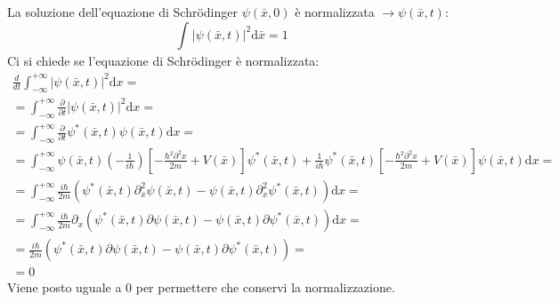 La soluzione dell'equazione di Schrödinger $\psi \left(\bar x,0\right)$ è normalizzata $\rightarrow \psi \left(\bar x,t\right)$:
\begin{equation}
\int_{}^{}{|\psi \left(\bar x,t\right)|^2 \textrm{d}\bar x}=1
\end{equation}
Ci si chiede se l'equazione di Schrödinger è normalizzata:
\begin{equation}\begin{split}
\frac{d}{dt}\int_{-\infty}^{+\infty}{|\psi \left(\bar x,t\right)|^2 \textrm{d}x}=\\
=\int_{-\infty}^{+\infty}{\frac{\partial }{\partial t}|\psi \left(\bar x,t\right)|^2 \textrm{d}x}=\\
=\int_{-\infty}^{+\infty}{\frac{\partial }{\partial t}\psi ^*\left(\bar x,t\right)\psi \left(\bar x,t\right) \textrm{d}x}=\\
=\int_{-\infty}^{+\infty}{\psi\left(\bar x,t\right) \left(-\frac{1}{i\hbar }\right)\left[-\frac{\hbar ^2\partial ^2 x}{2m}+V\left(\bar x\right)\right]\psi^*\left(\bar x,t\right)+\frac{1}{i\hbar }\psi^*\left(\bar x,t\right)\left[-\frac{\hbar ^2\partial ^2 x}{2m}+V\left(\bar x\right)\right]\psi \left(\bar x,t\right) \textrm{d}x}=\\
=\int_{-\infty}^{+\infty}{\frac{i\hbar }{2m}\left(\psi^*\left(\bar x,t\right)\partial^2_x\psi \left(\bar x,t\right) -\psi\left(\bar x,t\right) \partial ^2_x\psi ^*\left(\bar x,t\right)\right) \textrm{d}x}=\\
=\int_{-\infty}^{+\infty}{\frac{i\hbar }{2m}\partial _x\left(\psi^*\left(\bar x,t\right)\partial \psi\left(\bar x,t\right) -\psi\left(\bar x,t\right) \partial \psi^*\left(\bar x,t\right)\right) \textrm{d}x}=\\
=\frac{i\hbar }{2m}\left(\psi ^*\left(\bar x,t\right)\partial \psi \left(\bar x,t\right)-\psi \left(\bar x,t\right)\partial \psi ^*\left(\bar x,t\right)\right)=\\
=0 
\end{split}\end{equation}
Viene posto uguale a 0 per permettere che conservi la normalizzazione.

